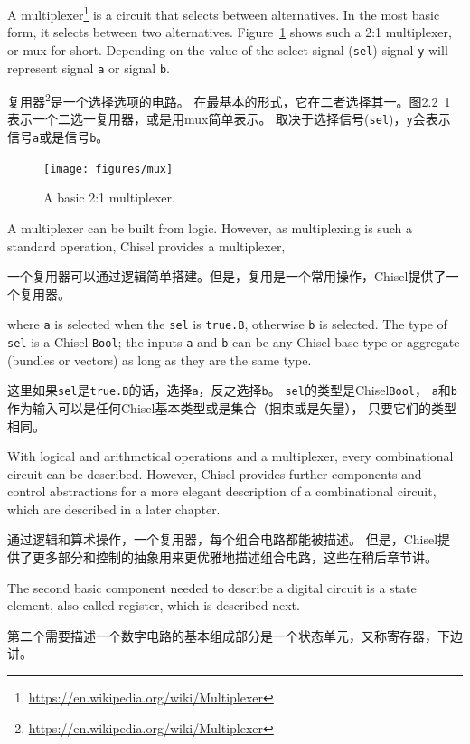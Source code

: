 \documentclass[%
    10pt,
    headinclude, footexclude,
    openright, %
    notitlepage,
    cleardoubleempty,
    headsepline,
    pointlessnumbers,
    bibtotoc, idxtotoc,
    ]{scrbook}
\newcommand{\code}[1]{{\small{\texttt{#1}}}}
\newcommand{\myref}[2]{\href{#1}{#2}}
\renewcommand{\myref}[2]{{#2}{\footnote{\url{#1}}}}
\begin{document}
A \myref{https://en.wikipedia.org/wiki/Multiplexer}{multiplexer} is a circuit that selects between alternatives.
In the most basic form, it selects between two alternatives. Figure~\ref{fig:mux} shows
such a 2:1 multiplexer, or mux for short. Depending on the value of the
select signal (\code{sel}) signal \code{y} will represent signal \code{a} or
signal \code{b}.

\myref{https://en.wikipedia.org/wiki/Multiplexer}{复用器}是一个选择选项的电路。
在最基本的形式，它在二者选择其一。图2.2~\ref{fig:mux}表示一个二选一复用器，或是用mux简单表示。
取决于选择信号(\code{sel})，\code{y}会表示信号\code{a}或是信号\code{b}。


\begin{figure}
  \centering
  \texttt{[image: figures/mux]}
  \caption{A basic 2:1 multiplexer.}
  \label{fig:mux}
\end{figure}

A multiplexer can be built from logic.
However, as multiplexing  is such a standard operation, Chisel provides a multiplexer,

一个复用器可以通过逻辑简单搭建。但是，复用是一个常用操作，Chisel提供了一个复用器。


\noindent where \code{a} is selected when the \code{sel} is \code{true.B}, otherwise \code{b}
is selected. The type of \code{sel} is a Chisel \code{Bool}; the inputs \code{a} and \code{b}
can be any Chisel base type or aggregate (bundles or vectors) as long as they are the same
type.

这里如果\code{sel}是\code{true.B}的话，选择\code{a}，反之选择\code{b}。
\code{sel}的类型是Chisel\code{Bool}， \code{a}和\code{b}作为输入可以是任何Chisel基本类型或是集合（捆束或是矢量），
只要它们的类型相同。

With logical and arithmetical operations and a multiplexer, every combinational
circuit can be described. However, Chisel provides further components and control abstractions
for a more elegant description of a combinational circuit, which are described in
a later chapter.

通过逻辑和算术操作，一个复用器，每个组合电路都能被描述。
但是，Chisel提供了更多部分和控制的抽象用来更优雅地描述组合电路，这些在稍后章节讲。


The second basic component needed to describe a digital circuit is a state element,
also called register, which is described next.

第二个需要描述一个数字电路的基本组成部分是一个状态单元，又称寄存器，下边讲。
\end{document}
